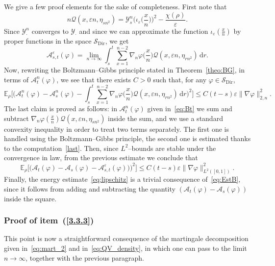 \documentclass[AHL,Unicode,longabstracts]{cedram}
\DeclareMathOperator{\Dir}{Dir}
\newcommand{\bb}[1]{{\mathbb #1}}
\newcommand{\mc}[1]{{\mathcal #1}}
\renewcommand{\mc}[1]{{\mathcal #1}}
\renewcommand{\leq}{\leqslant}
\newcommand*{\dd}{\mathrm{d}}
\newcommand*{\dr}{\dd r}
\renewcommand{\tfrac}{\frac}
\begin{document}
We give a few proof elements for the sake of completeness. First note that
\[
n\mc Q(x,\varepsilon n,\eta_{sn^2})=\mc Y^n_s\Big(\iota_{\varepsilon}\Big(\tfrac xn\Big)\Big)^2-\tfrac {\chi(\rho)}{\varepsilon}.
\]
Since $\mc Y^n_\cdot$ converges to $\mc Y_\cdot$ and since we can approximate the function $\iota_{\varepsilon}(\tfrac xn)$ by proper functions in the space $\mc S_{\mathrm{Dir}}$, we get
\[
\mc A^\varepsilon_{s,t}(\varphi)=\lim_{n\to\infty}\int_s^t\sum_{x=1}^{n-2}\nabla_n\varphi\Big(\tfrac xn\Big)\mc Q(x,\varepsilon n,\eta_{rn^2})\,\dr.
\]
Now, rewriting the Boltzmann--Gibbs principle stated in Theorem~\ref{theo:BG}, in terms of $\mc A_t^n(\varphi)$, we see that there exists $C>0$ such that, for any {$\varphi \in \mc S_{\Dir}$},
\begin{equation*}
\bb E_\rho\Big[\Big({\mc A^n_t(\varphi)-\mc A^n_s(\varphi)}-\int_s^t\sum_{x=1}^{n-2}\nabla_n\varphi\Big(\tfrac xn\Big)\mc Q(x,\varepsilon n,\eta_{rn^2})\,\dr\Big)^2\Big] \leq C(t-s)\varepsilon \big\|\nabla\varphi\big\|_{2,n}^2.
\end{equation*}
The last claim is proved as follows: in {$\mc A_t^n(\varphi)$} given in~\eqref{eq:Bt} we sum and subtract $\nabla_n\varphi(\frac x n)\mc Q(x,\varepsilon n,\eta_{sn^2})$ inside the sum, and we use a standard convexity inequality in order to treat two terms separately. The first one is handled using the Boltzmann--Gibbs principle, the second one is estimated thanks to the computation~\eqref{last}. Then, since $L^2$--bounds are stable under the convergence in law, from the previous estimate we conclude that
\begin{equation}\label{eq:EstB}
\bb E_\rho\Big[\Big({\mc A_t(\varphi)-\mc A_s(\varphi)}-\mc A^\varepsilon_{s,t}(\varphi))\Big)^2\Big] \leq C(t-s)\varepsilon \big\|\nabla\varphi\big\|_{L^2([0,1])}^2.
\end{equation}
Finally, the energy estimate~\eqref{eq:lipschitz} is a trivial consequence of~\eqref{eq:EstB}, since it follows from adding and subtracting the quantity {$(\mc A_t(\varphi)-\mc A_s(\varphi))$} inside the square.

\subsubsection{Proof of item~(\ref{3.3.3})}

This point is now a straightforward consequence of the martingale decomposition given in~\eqref{eq:mart_2} and in~\eqref{eq:QV_density}, in which one can pass to the limit $n\to\infty$, together with the previous paragraph.
\end{document}
